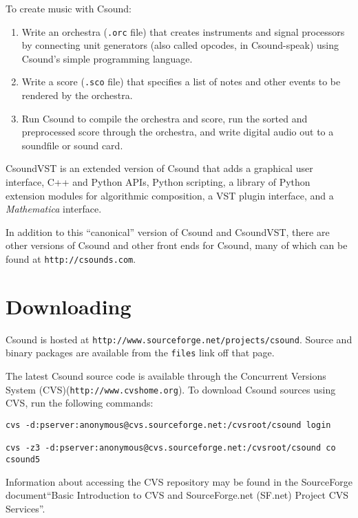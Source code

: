 \documentclass[10pt,letterpaper,onecolumn]{ltxguide}
\begin{document}
To create music with Csound:

\begin{enumerate}
\item Write an orchestra (\texttt{.orc} file) that creates instruments and signal processors by connecting unit generators (also called opcodes, in Csound-speak) using Csound's simple programming language.
\item Write a score (\texttt{.sco} file) that specifies a list of notes and other events to be rendered by the orchestra.
\item Run Csound to compile the orchestra and score, run the sorted and preprocessed score through the orchestra, and write digital audio out to a soundfile or sound card.
\end{enumerate}

CsoundVST is an extended version of Csound that adds a graphical user interface, C++ and Python APIs, Python scripting, a library of Python extension modules for algorithmic composition, a VST plugin interface, and a \emph{Mathematica} interface.

In addition to this ``canonical'' version of Csound and CsoundVST, there are other versions of Csound and other front ends for Csound, many of which can be found at \texttt{http://csounds.com}.

\section{Downloading}

Csound is hosted at \texttt{http:\-//www.sourceforge.net/projects/\-csound}. \linebreak Source and binary packages are available from the \texttt{files} link off that page.

The latest Csound source code is available through the Concurrent Versions System (CVS)(\texttt{http:\-//www.cvshome.org}). To download Csound sources using CVS, run the following commands:

\begin{verbatim}
cvs -d:pserver:anonymous@cvs.sourceforge.net:/cvsroot/csound login 
 
cvs -z3 -d:pserver:anonymous@cvs.sourceforge.net:/cvsroot/csound co csound5 
\end{verbatim}

Information about accessing the CVS repository may be found in the SourceForge document``Basic Introduction to CVS and SourceForge.net (SF.net) Project CVS Services''. 
\end{document}
